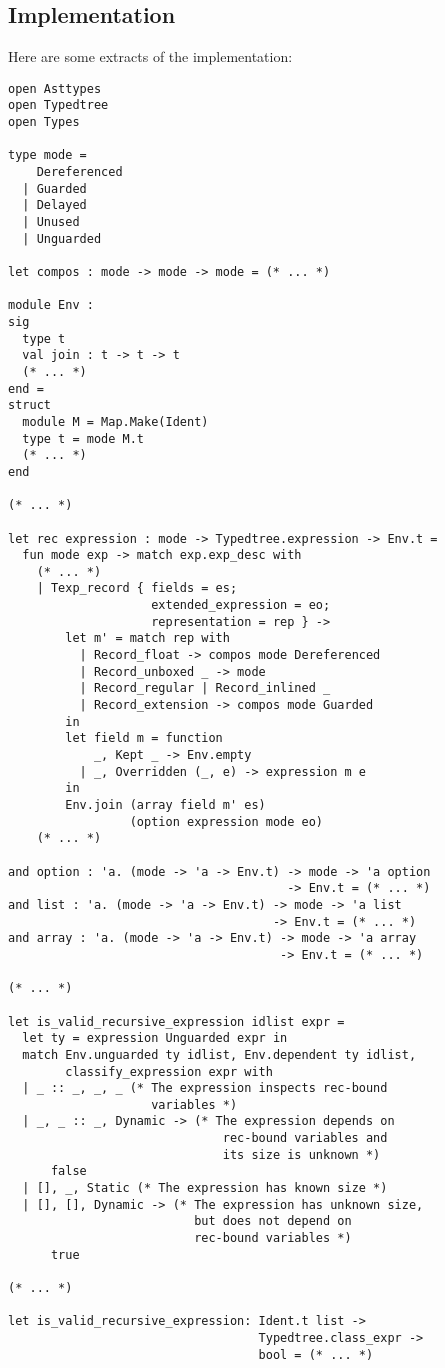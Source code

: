 \documentclass{article}
\begin{document}
\subsection{Implementation}

Here are some extracts of the implementation:
\begin{lstlisting}
open Asttypes
open Typedtree
open Types

type mode =
    Dereferenced
  | Guarded
  | Delayed
  | Unused
  | Unguarded

let compos : mode -> mode -> mode = (* ... *)

module Env :
sig
  type t
  val join : t -> t -> t
  (* ... *)
end =
struct
  module M = Map.Make(Ident)
  type t = mode M.t
  (* ... *)
end

(* ... *)

let rec expression : mode -> Typedtree.expression -> Env.t =
  fun mode exp -> match exp.exp_desc with
    (* ... *)
    | Texp_record { fields = es;
                    extended_expression = eo;
                    representation = rep } ->
        let m' = match rep with
          | Record_float -> compos mode Dereferenced
          | Record_unboxed _ -> mode
          | Record_regular | Record_inlined _
          | Record_extension -> compos mode Guarded
        in
        let field m = function
            _, Kept _ -> Env.empty
          | _, Overridden (_, e) -> expression m e
        in
        Env.join (array field m' es)
                 (option expression mode eo)
    (* ... *)

and option : 'a. (mode -> 'a -> Env.t) -> mode -> 'a option
                                       -> Env.t = (* ... *)
and list : 'a. (mode -> 'a -> Env.t) -> mode -> 'a list
                                     -> Env.t = (* ... *)
and array : 'a. (mode -> 'a -> Env.t) -> mode -> 'a array
                                      -> Env.t = (* ... *)

(* ... *)

let is_valid_recursive_expression idlist expr =
  let ty = expression Unguarded expr in
  match Env.unguarded ty idlist, Env.dependent ty idlist,
        classify_expression expr with
  | _ :: _, _, _ (* The expression inspects rec-bound
                    variables *)
  | _, _ :: _, Dynamic -> (* The expression depends on
                              rec-bound variables and
                              its size is unknown *)
      false
  | [], _, Static (* The expression has known size *)
  | [], [], Dynamic -> (* The expression has unknown size,
                          but does not depend on
                          rec-bound variables *)
      true

(* ... *)

let is_valid_recursive_expression: Ident.t list ->
                                   Typedtree.class_expr ->
                                   bool = (* ... *)
\end{lstlisting}
\end{document}
